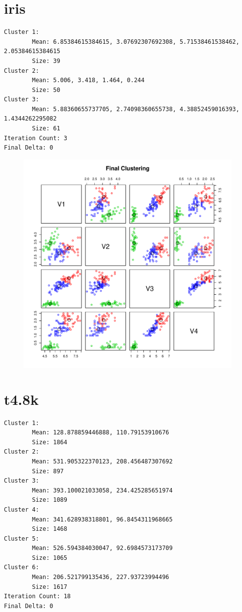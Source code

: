 \documentclass{report}
\begin{document}
\pagebreak

\section*{iris}

\begin{verbatim}
Cluster 1:
        Mean: 6.85384615384615, 3.07692307692308, 5.71538461538462, 2.05384615384615 
        Size: 39 
Cluster 2:
        Mean: 5.006, 3.418, 1.464, 0.244 
        Size: 50 
Cluster 3:
        Mean: 5.88360655737705, 2.74098360655738, 4.38852459016393, 1.4344262295082 
        Size: 61 
Iteration Count: 3 
Final Delta: 0 
\end{verbatim}

\begin{figure}[htp!]
  \centering
  \includegraphics[width=0.9\linewidth]{iris}
\end{figure}

\pagebreak

\section*{t4.8k}

\begin{verbatim}
Cluster 1:
        Mean: 128.878859446888, 110.79153910676 
        Size: 1864 
Cluster 2:
        Mean: 531.905322370123, 208.456487307692 
        Size: 897 
Cluster 3:
        Mean: 393.100021033058, 234.425285651974 
        Size: 1089 
Cluster 4:
        Mean: 341.628938318801, 96.8454311968665 
        Size: 1468 
Cluster 5:
        Mean: 526.594384030047, 92.6984573173709 
        Size: 1065 
Cluster 6:
        Mean: 206.521799135436, 227.93723994496 
        Size: 1617 
Iteration Count: 18 
Final Delta: 0 
\end{verbatim}
\end{document}
